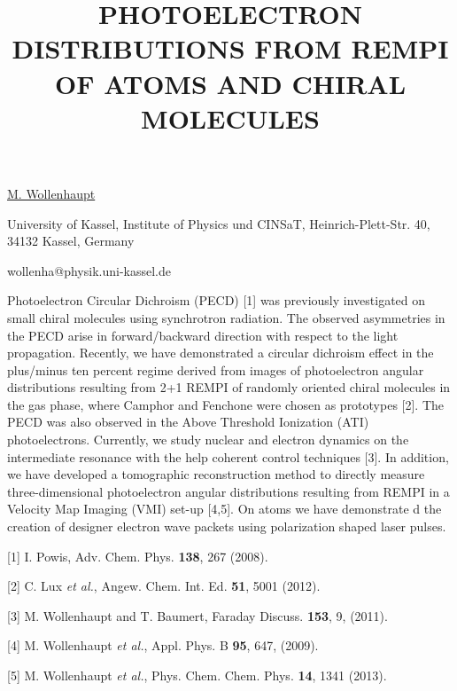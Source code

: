 \title{PHOTOELECTRON DISTRIBUTIONS FROM REMPI OF ATOMS AND CHIRAL MOLECULES}

\underline{M. Wollenhaupt} 

{\normalsize{\vspace{-4mm}
University of Kassel, Institute of Physics und CINSaT, Heinrich-Plett-Str. 40, 34132 Kassel, Germany

\email wollenha@physik.uni-kassel.de}}

Photoelectron Circular Dichroism (PECD) [1] was previously investigated on small chiral molecules using synchrotron radiation.  The observed asymmetries in the PECD arise in forward/backward direction with respect to the light propagation. Recently, we have demonstrated a circular dichroism effect in the plus/minus ten percent regime derived from images of photoelectron angular distributions resulting from 2+1 REMPI of randomly oriented chiral molecules in the gas phase, where Camphor and Fenchone were chosen as prototypes [2]. The PECD was also observed in the Above Threshold Ionization (ATI) photoelectrons. Currently, we study nuclear and electron dynamics on the intermediate resonance with the help coherent control techniques [3]. In addition, we have developed a tomographic reconstruction method to directly measure three-dimensional photoelectron angular distributions resulting from REMPI in a Velocity Map Imaging (VMI) set-up [4,5]. On atoms we have demonstrate
 d the creation of designer electron wave packets using polarization shaped laser pulses.


{\normalsize
[1] I. Powis, Adv. Chem. Phys. \textbf{138}, 267 (2008).
\vsp

[2] C. Lux \textit{et al.}, Angew. Chem. Int. Ed. \textbf{51}, 5001 (2012).
\vsp

[3] M. Wollenhaupt and T. Baumert, Faraday Discuss. \textbf{153}, 9, (2011).
\vsp

[4] M. Wollenhaupt \textit{et al.}, Appl. Phys. B \textbf{95}, 647, (2009).
\vsp

[5] M. Wollenhaupt \textit{et al.}, Phys. Chem. Chem. Phys. \textbf{14}, 1341 (2013).
}

\vspace{\baselineskip}

